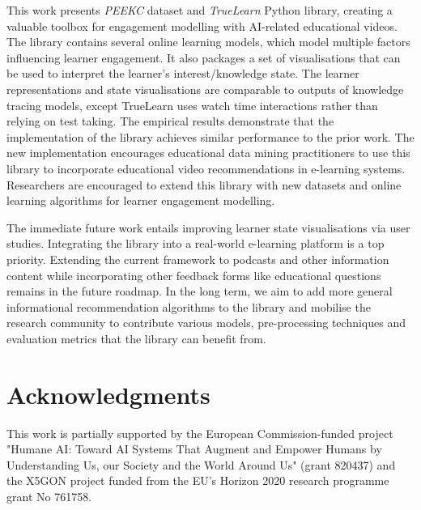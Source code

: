 \documentclass[letterpaper]{article} %
\begin{document}
{This work presents \textit{PEEKC} dataset and \textit{TrueLearn} Python library, creating a valuable toolbox for engagement modelling with AI-related educational videos. The library contains several online learning models, which model multiple factors influencing learner engagement. It also packages a set of visualisations that can be used to interpret the learner's interest/knowledge state. The learner representations and state visualisations are comparable to outputs of knowledge tracing models, except TrueLearn uses watch time interactions rather than relying on test taking. The empirical results demonstrate that the implementation of the library achieves similar performance to the prior work. The new implementation encourages educational data mining practitioners to use this library to incorporate educational video recommendations in e-learning systems. Researchers are encouraged to extend this library with new datasets and online learning algorithms for learner engagement modelling.}

The immediate future work entails improving learner state visualisations via user studies. 
Integrating the library into a real-world e-learning platform \cite{10.1145/3397482.3450721} is a top priority. 
Extending the current framework to podcasts and other information content while incorporating other feedback forms like educational questions \cite{bulathwela2023scalable,bulath2023neurips} remains in the future roadmap. 
In the long term, we aim to add more general informational recommendation algorithms to the library and mobilise the research community to contribute various models, pre-processing techniques and evaluation metrics that the library can benefit from. 

\section{Acknowledgments}
This work is partially supported by the European Commission-funded project "Humane AI: Toward AI Systems That Augment and Empower Humans by Understanding Us, our Society and the World Around Us" (grant 820437) and the X5GON project funded from the EU's Horizon 2020 research programme grant No 761758.
\end{document}
